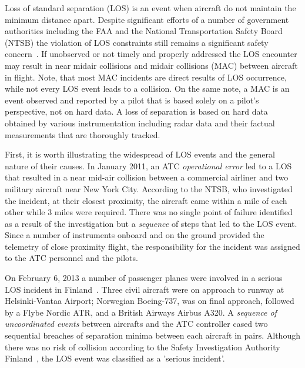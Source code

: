 \documentclass[letter,onecolumn,12pt]{aiaa-tc}
\newcommand{\1}{1_n}
\begin{document}
Loss of standard separation (LOS) is an event when aircraft do not maintain the minimum distance apart. Despite significant efforts of a number of government authorities including the FAA and the National Transportation Safety Board (NTSB) the violation of LOS constraints still remains a significant safety concern~\cite{OIG_AR2013}. If unobserved or not timely and properly addressed the LOS encounter may result in near midair collisions and midair collisions (MAC) between aircraft in flight. Note, that most MAC incidents are direct results of LOS occurrence, while not every LOS event leads to a collision. On the same note, a MAC is an event observed and reported by a pilot that is based solely on a pilot's perspective, not on hard data. A loss of separation is based on hard data obtained by various instrumentation including radar data and their factual measurements that are thoroughly tracked.

First, it is worth illustrating the widespread of LOS events and the general nature of their causes. In January 2011, an ATC \emph{operational error} led to a LOS that resulted in a near mid-air collision  between a commercial airliner and two military aircraft near New York City. According to the NTSB\cite{OIG_AR2013}, who investigated the incident, at their closest proximity, the aircraft came within a mile of each other while 3 miles were required. There was no single point of failure identified as a result of the investigation but a \emph{sequence} of steps that led to the LOS event. Since a number of instruments onboard and on the ground provided the telemetry of close proximity flight, the responsibility for the incident was assigned to the ATC personnel and the pilots.

On February 6, 2013  a number of  passenger planes were involved in a serious LOS incident in Finland~\cite{Vantaa_IR2013}.  Three civil aircraft were on approach to runway at Helsinki-Vantaa Airport; Norwegian Boeing-737, was on final approach, followed by a Flybe Nordic ATR, and a British Airways Airbus A320. A \emph{sequence of uncoordinated events} between aircrafts and the ATC controller cased two sequential breaches of separation minima between each aircraft in pairs. Although there was no risk of collision according to the Safety Investigation Authority Finland~\cite{Vantaa_IR2013}, the LOS event was classified as a 'serious incident'.
\end{document}
